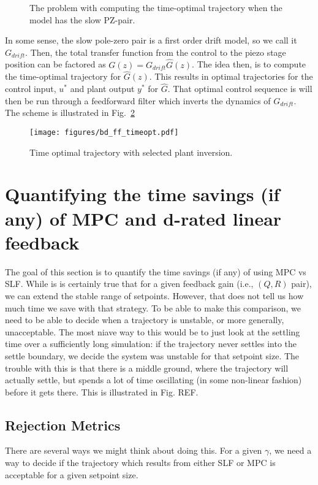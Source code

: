 \documentclass[journal,12pt,onecolumn,draftclsnofoot,,twoside]{IEEEtran/IEEEtran}
\begin{document}
\begin{figure}
  \centering
  
  
  \caption{The problem with computing the time-optimal trajectory when the model has the slow PZ-pair.}
  \label{fig:slowpz_to}
\end{figure}
In some sense, the slow pole-zero pair is a first order drift model, so we call it $G_{drift}$. Then, the total transfer function from the control to the piezo stage position can be factored as $G(z) = G_{drift}\hat{G}(z)$. The idea then, is to compute the time-optimal trajectory for $\hat{G}(z)$. This results in optimal trajectories for the control input, $u^*$ and plant output $y^*$ for $\hat{G}$. That optimal control sequence is will then be run through a feedforward filter which inverts the dynamics of $G_{drift}$. The scheme is illustrated in Fig.~\ref{fig:bd_ff_to}
\begin{figure}
  \centering
  \texttt{[image: figures/bd\_ff\_timeopt.pdf]}
  \caption{Time optimal trajectory with selected plant inversion.}
  \label{fig:bd_ff_to}
\end{figure}


\section{Quantifying the time savings (if any) of MPC and d-rated linear feedback}
\label{sec:org7edf36d}
The goal of this section is to quantify the time savings (if any) of using MPC vs SLF. While is is certainly true that for a given feedback gain (i.e., $(Q,R)$ pair), we can extend the stable range of setpoints. However, that does not tell us how much time we save with that strategy. To be able to make this comparison, we need to be able to decide when a trajectory is unstable, or more generally, unacceptable. The most niave way to this would be to just look at the settling time over a sufficiently long simulation: if the trajectory never settles into the settle boundary, we decide the system was unstable for that setpoint size. The trouble with this is that there is a middle ground, where the trajectory will actually settle, but spends a lot of time oscillating (in some non-linear fashion) before it gets there. This is illustrated in Fig. REF.


\subsection{Rejection Metrics}
There are several ways we might think about doing this. 
For a given $\gamma$, we need a way to decide if the trajectory which results from either SLF or MPC is acceptable for a given setpoint size.
\end{document}
